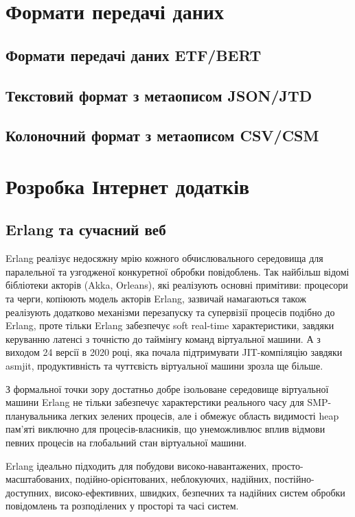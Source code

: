 \section{Формати передачі даних}

\subsection{Формати передачі даних ETF/BERT}

\subsection{Текстовий формат з метаописом JSON/JTD}

\subsection{Колоночний формат з метаописом CSV/CSM}

\newpage
\section{Розробка Інтернет додатків}

\subsection{Erlang та сучасний веб}

Erlang реалізує недосяжну мрію кожного обчислювального середовища для
паралельної та узгодженої конкуретної обробки повідоблень. Так найбільш
відомі бібліотеки акторів (Akka, Orleans), які реалізують основні примітиви:
процесори та черги, копіюють модель акторів Erlang, зазвичай намагаються
також реалізують додатково механізми перезапуску та супервізії процесів
подібно до Erlang, проте тільки Erlang забезпечує soft real-time характеристики,
завдяки керуванню латенсі з точністю до таймінгу команд віртуальної машини.
А з виходом 24 версії в 2020 році, яка почала підтримувати JIT-компіляцію
завдяки asmjit, продуктивність та чуттєвість віртуальної машини зрозла
ще більше.

З формальної точки зору достатньо добре ізольоване середовище віртуальної
машини Erlang не тільки забезпечує характерстики реального часу для
SMP-планувальника легких зелених процесів, але і обмежує область видимості
heap пам'яті виключно для процесів-власників, що унеможливлює вплив відмови
певних процесів на глобальний стан віртуальної машини.

Erlang ідеально підходить для побудови високо-навантажених,
просто-масштабованих, подійно-орієнтованих, неблокуючих, надійних,
постійно-доступних, високо-ефективних, швидких, безпечних та надійних
систем обробки повідомлень та розподілених у просторі та часі систем.

